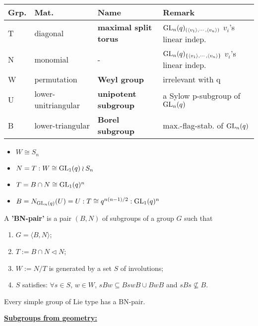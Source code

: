 \documentclass[a4paper,11pt]{article}
\begin{document}
\begin{table*}[htbp]
    \centering
    \begin{tabular}{llll}
        \toprule
        Grp. & Mat. & Name & Remark\\
        \midrule
        T & diagonal  & \textbf{maximal split torus} &  $\mathrm{GL}_n(q)_{(\langle v_1\rangle,\cdots,\langle v_n\rangle)}$ $v_i$'s linear indep.\\
        N & monomial & - & $\mathrm{GL}_n(q)_{\{\langle v_1\rangle,\cdots,\langle v_n\rangle\}}$ $v_i$'s linear indep.\\
        W & permutation  & \textbf{Weyl group} & irrelevant with q\\
        U & lower-unitriangular & \textbf{unipotent subgroup} & a Sylow p-subgroup of $\mathrm{GL}_n(q)$ \\
        B & lower-triangular & \textbf{Borel subgroup} & max.-flag-stab. of $\mathrm{GL}_n(q)$ \\
        \bottomrule
    \end{tabular}
    \label{matsubgp}
\end{table*}
\begin{itemize}[itemsep=0pt,label=-]
    \item $W\cong S_n$
    \item $N=T:W\cong \mathrm{GL}_1(q)\wr S_n$
    \item $T=B\cap N\cong \mathrm{GL}_1(q)^n$
    \item $B=N_{\mathrm{GL}_n(q)}(U)=U:T\cong q^{n(n-1)/2}:\mathrm{GL}_1(q)^n$
\end{itemize}

\begin{definition}
    A \textbf{'BN-pair'} is a pair $(B,N)$ of subgroups of a group $G$ such that
    \begin{enumerate}[itemsep=0pt,label=(\roman*)]
        \item $G=\langle B,N\rangle$;
        \item $T:=B\cap N\triangleleft N$;
        \item $W:=N/T$ is generated by a set $S$ of involutions;
        \item $S$ satisfies: $\forall s\in S$, $w\in W$, $sBw\subseteq BswB\cup BwB$ and $sBs\not\subseteq B$.
    \end{enumerate}
\end{definition}

Every simple group of Lie type has a BN-pair.

\noindent\textbf{\underline{Subgroups from geometry:}}
\end{document}
